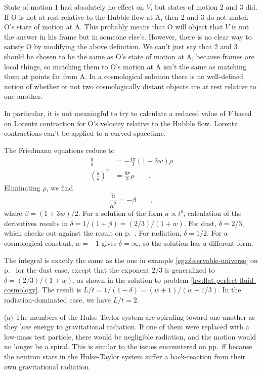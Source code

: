 State of motion 1 had absolutely no effect on $V$, but states of motion
2 and 3 did. If O is not at rest relative to the Hubble flow at A,
then 2 and 3 do not match O's state of motion at A. This probably
means that O will object that $V$ is not the answer in his frame but in
someone else's. However, there is no clear way to satisfy O by
modifying the above definition. We can't just say that 2 and 3 should
be chosen to be the same as O's state of motion at A, because frames
are local things, so matching them to O's motion at A isn't the same
as matching them at points far from A. In a cosmological solution
there is no well-defined notion of whether or not two cosmologically
distant objects are at rest relative to one another.

In particular, it is not meaningful to try to calculate a reduced
value of $V$ based on Lorentz contraction for O's velocity relative
to the Hubble flow. Lorentz contractions can't be applied to
a curved spacetime.

The Friedmann equations reduce to
\begin{align*}
  \frac{\ddot{a}}{a}   \quad          &= - \frac{4\pi}{3}(1+3w)\rho \\
  \left(\frac{\dot{a}}{a}\right)^2    &=  \frac{8\pi}{3}\rho \qquad .
\end{align*}
Eliminating $\rho$, we find
\begin{equation*}
  \frac{\ddot{a}}{\dot{a}^2} = -\beta \qquad ,
\end{equation*}
where $\beta=(1+3w)/2$. For a solution of the form $a\propto t^\delta$, calculation of the
derivatives results in $\delta=1/(1+\beta)=(2/3)/(1+w)$. For dust, $\delta=2/3$, which checks
out against the result on p.~\pageref{flat-dust}. For radiation, $\delta=1/2$.
For a cosmological constant, $w= -1$ gives $\delta=\infty$, so the solution has a different form.

The integral is exactly the same as the one in example \ref{eg:observable-universe} on p.~\pageref{eg:observable-universe}
for the dust case, except that the exponent $2/3$ is generalized to $\delta=(2/3)/(1+w)$, as shown in the solution to
problem \ref{hw:flat-perfect-fluid-cosmology}. The result is $L/t=1/(1-\delta)=(w+1)/(w+1/3)$. In the radiation-dominated
case, we have $L/t=2$.


(a) The members of the Hulse-Taylor system are spiraling toward one another as they lose energy to
gravitational radiation. If one of them were replaced with a low-mass test particle, there
would be negligible radiation, and the motion would no longer be a spiral. This is similar
to the issues encountered on pp.~\pageref{sec:chiao-paradox}ff because the neutron stars in
the Hulse-Taylor system suffer a back-reaction from their own gravitational radiation.

